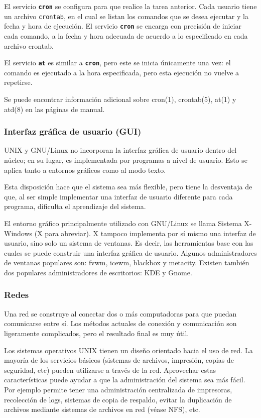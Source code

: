 \documentclass[12pt]{article}
\begin{document}
 El servicio \texttt{\textbf{cron}} se configura para que realice la
tarea anterior. Cada usuario tiene un archivo \texttt{crontab}, en
el cual se listan los comandos que se desea ejecutar y la fecha y hora de
ejecución. El servicio \texttt{\textbf{cron}} se encarga con precisión de
iniciar cada comando, a la fecha y hora adecuada de acuerdo a lo especificado en
cada archivo crontab.  

 El servicio \texttt{\textbf{at}} es similar a \texttt{\textbf{cron}},
pero este se inicia únicamente una vez: el comando es ejecutado a la hora
especificada, pero esta ejecución no vuelve a repetirse.  

 Se puede encontrar información adicional sobre cron(1), crontab(5), at(1)
y atd(8) en las páginas de manual.  

\subsubsection{ Interfaz gráfica de usuario (GUI)}

 UNIX y GNU/Linux no incorporan la interfaz gráfica de usuario dentro del
núcleo; en su lugar, es implementada por programas a nivel de usuario. Esto se
aplica tanto a entornos gráficos como al modo texto.  

 Esta disposición hace que el sistema sea más flexible, pero tiene la
desventaja de que, al ser simple implementar una interfaz de usuario diferente
para cada programa, dificulta el aprendizaje del sistema.  

 El entorno gráfico principalmente utilizado con GNU/Linux se llama
Sistema X-Windows (X para abreviar). X tampoco implementa por sí mismo una
interfaz de usuario, sino solo un sistema de ventanas. Es decir, las
herramientas base con las cuales se puede construir una interfaz gráfica de
usuario. Algunos administradores de ventanas populares son: fvwm, icewm,
blackbox y metacity. Existen también dos populares administradores de
escritorios: KDE y Gnome.  


\subsubsection{ Redes}

 Una red se construye al conectar dos o más computadoras para que puedan
comunicarse entre sí. Los métodos actuales de conexión y comunicación son
ligeramente complicados, pero el resultado final es muy útil.  

 Los sistemas operativos UNIX tienen un diseño orientado hacia el uso 
de red. La mayoría de los servicios básicos (sistemas de archivos, impresión, 
copias de seguridad, etc) pueden utilizarse a través de la red. Aprovechar estas
características puede ayudar a que la administración del sistema sea más fácil. 
Por ejemplo permite tener una administración centralizada de impresoras, recolección 
de logs, sistemas de copia de respaldo, evitar la duplicación 
de archivos mediante sistemas de archivos en red (véase NFS), etc.
\end{document}
